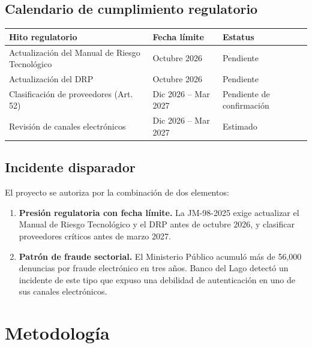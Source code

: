 \documentclass[11pt,a4paper]{article}
\begin{document}
	\subsection{Calendario de cumplimiento regulatorio}
	
	\begin{table}[H]
		\centering
		\begin{tabular}{@{}p{6cm}p{4cm}p{4cm}@{}}
			\toprule
			\textbf{Hito regulatorio} & \textbf{Fecha límite} & \textbf{Estatus} \\ \midrule
			Actualización del Manual de Riesgo Tecnológico & Octubre 2026 & Pendiente \\
			Actualización del DRP & Octubre 2026 & Pendiente \\
			Clasificación de proveedores (Art. 52) & Dic 2026 -- Mar 2027 & Pendiente de confirmación \\
			Revisión de canales electrónicos & Dic 2026 -- Mar 2027 & Estimado \\ \bottomrule
		\end{tabular}
	\end{table}
	
	\subsection{Incidente disparador}
	
	El proyecto se autoriza por la combinación de dos elementos:
	
	\begin{enumerate}[leftmargin=1.5em]
		\item \textbf{Presión regulatoria con fecha límite.} La JM-98-2025 exige actualizar el Manual de Riesgo Tecnológico y el DRP antes de octubre 2026, y clasificar proveedores críticos antes de marzo 2027.
		\item \textbf{Patrón de fraude sectorial.} El Ministerio Público acumuló más de 56,000 denuncias por fraude electrónico en tres años. Banco del Lago detectó un incidente de este tipo que expuso una debilidad de autenticación en uno de sus canales electrónicos.
	\end{enumerate}
	
	
	\section{Metodología}
	
\end{document}
